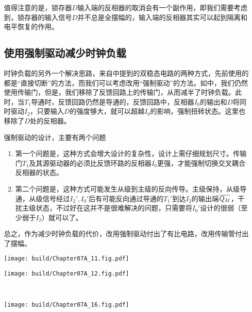 值得注意的是，锁存器$D$输入端的反相器的取消会有一个副作用，即我们需要考虑到，锁存器的输入信号$D$并不总是全摆幅的，输入端的反相器其实可以起到隔离和电平恢复的作用。

\subsection{使用强制驱动减少时钟负载}
时钟负载的另外一个解决思路，来自中提到的双稳态电路的两种方式，先前使用的都是“直接切断”的方法，而我们可以考虑改用“强制驱动”的方法。如中，我们仍然使用传输门，但是，我们移除了反馈回路上的传输门，从而减半了时钟负载。此时，当$T_1$导通时，反馈回路仍然是导通的，反馈回路中，反相器$I_0$的输出和$D$将同时驱动$I_2$，只要输入$D$的强度够大，就可以超越$I_0$的影响，强制扭转状态。这里也移除了$D$处的反相器。

强制驱动的设计，主要有两个问题
\begin{enumerate}
    \item 第一个问题是，这种方式会增大设计的复杂性，设计上需仔细规划尺寸。传输门$T_1$及其源驱动器的必须比反馈环路的反相器$I_0$更强，才能强制切换交叉耦合反相器的状态。
    \item 第二个问题是，这种方式可能发生从级到主级的反向传导。主级保持，从级导通，从级信号经过$I_2',I_0'$后有可能反向通过导通的$T_1'$到达$I_2$的输出端$\overline{Q_M}$，干扰主级状态，不过好在这并不是很难解决的问题，只需要将$I_0'$设计的很弱（至少弱于$I_2$）就可以了。
\end{enumerate}
总之，作为减少时钟负载的代价，改用强制驱动付出了有比电路，改用传输管付出了摆幅。

\begin{Figure}[使用强制驱动减少时钟负载]
    \begin{FigureSub}
        \texttt{[image: build/Chapter07A\_11.fig.pdf]}
    \end{FigureSub}
    \hspace{0.1cm}
    \begin{FigureSub}
        \texttt{[image: build/Chapter07A\_12.fig.pdf]}
    \end{FigureSub}\\
    \vspace{0.5cm}
    \begin{FigureSub}
        \texttt{[image: build/Chapter07A\_16.fig.pdf]}
    \end{FigureSub}
\end{Figure}